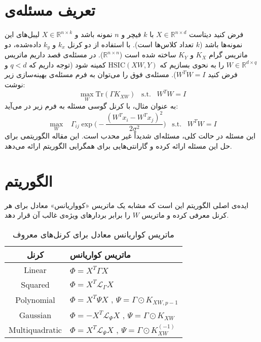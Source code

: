 \documentclass[a4paper]{article}
\begin{document}
	\section{تعریف مسئله‌ی 
	}
	فرض کنید دیتاست 
	$X \in \mathbb{R}^{n\times d}$
	با $k$ فیچر و $n$ نمونه باشد و 
	$X \in \mathbb{R}^{n\times k}$
	لیبل‌های این نمونه‌ها باشد ($k$ تعداد کلاس‌ها است). با استفاده از دو کرنل $k_x$ و $k_y$ داده‌شده، دو ماتریس گرام $K_X$ و $K_Y$ ساخته شده است
	($\mathbb{R}^{n\times n}$). 
	در مسئله‌ی 
	قصد داریم ماتریس 
	$W \in \mathbb{R}^{d\times q}$
	را به نحوی بسازیم که 
	$\mathrm{HSIC}(XW, Y)$
	کمینه شود (توجه داریم که 
	$q<d$
	و فرض کنید 
	$W^TW = I$).
	مسئله‌ی فوق را می‌توان به فرم مسئله‌ی بهینه‌سازی زیر نوشت:
	$$\max_W \mathrm{Tr}(\Gamma K_{XW})\;\;\;\mathrm{s.t.}\;\;\;W^TW=I$$
	به عنوان مثال، با کرنل گوسی مسئله به فرم زیر در می‌آید:
	$$\max_W \;\;\; \Gamma_{ij} \exp\Big(-\frac{(W^Tx_i - W^Tx_j)^2}{2\sigma^2}\Big) \;\;\;  \mathrm{s.t.}  \;\;\;W^TW=I$$
	این مسئله در حالت کلی، مسئله‌ای شدیداً غیر محدب است. این مقاله الگوریتمی برای حل این مسئله ارائه کرده و گارانتی‌هایی برای همگرایی الگوریتم ارائه می‌دهد.
	\section{الگوریتم 
	}
	ایده‌ی اصلی الگوریتم این است که مشابه 
	یک ماتریس «کوواریانس» معادل برای هر کرنل معرفی کرده و ماتریس $W$ را برابر بردار‌های ویژه‌ی غالب آن قرار دهد.
	
	\begin{table}[h]   
		\begin{center}
			\begin{tabular}{c|l}
				کرنل& ماتریس کواریانس
				
				\\\hline
				Linear
				& $\Phi=X^T\Gamma X$ \\
				Squared
				& $\Phi=X^T \mathcal{L}_{\Gamma}X$ \\  
				Polynomial
				& $\Phi=X^T\Psi X$ 
				\hspace{0.2cm}
				,
				\hspace{0.2cm}           	
				$\Psi = \Gamma \odot K_{XW,p-1}$ \\ 
				Gaussian
				& $\Phi=-X^T\mathcal{L}_{\Psi} X$ 
				,
				$\Psi = \Gamma \odot K_{XW}$\\
				Multiquadratic
				& $\Phi=X^T\mathcal{L}_{\Psi} X$ 
				,
				$\Psi = \Gamma \odot K_{XW}^{(-1)}$\\ 
			\end{tabular}
		\end{center}
		\caption{ماتریس کواریانس معادل برای کرنل‌های معروف}
		\label{table:phis}
	\end{table}
	
\end{document}
